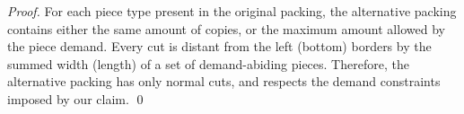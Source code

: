 \documentclass[smallextended]{svjour3}       %
\begin{document}
\begin{proof}
For each piece type present in the original packing, the alternative packing contains either the same amount of copies, or the maximum amount allowed by the piece demand.
Every cut is distant from the left (bottom) borders by the summed width (length) of a set of demand-abiding pieces.
Therefore, the alternative packing has only normal cuts, and respects the demand constraints imposed by our claim. \qed





\end{proof}
\end{document}
